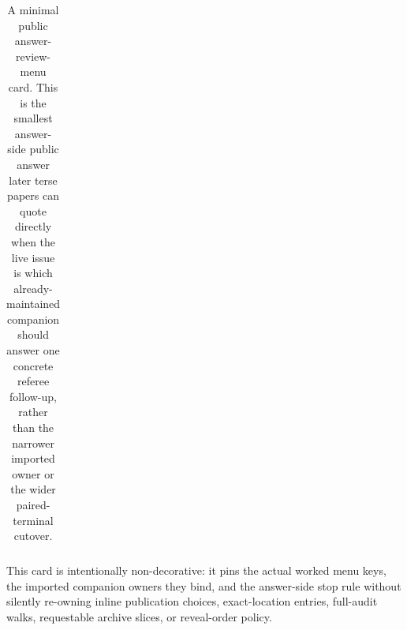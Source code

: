 \documentclass[11pt]{article}
\begin{document}
\begin{table}[t]
\begin{tabularx}{\linewidth}{@{}lX@{}}
\bottomrule
\end{tabularx}
\caption{A minimal public answer-review-menu card. This is the smallest answer-side public answer later terse papers can quote directly when the live issue is which already-maintained companion should answer one concrete referee follow-up, rather than the narrower imported owner or the wider paired-terminal cutover.}
\label{tab:minimal-public-answer-review-menu-card}
\end{table}

This card is intentionally non-decorative: it pins the actual worked menu keys, the imported companion owners they bind, and the answer-side stop rule without silently re-owning inline publication choices, exact-location entries, full-audit walks, requestable archive slices, or reveal-order policy.
\cite{series:workedexample}
\end{document}
